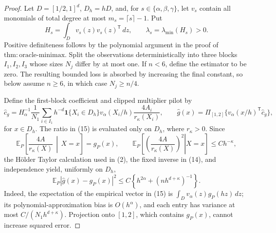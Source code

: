 \documentclass{article}
\begin{document}
\begin{proof}
Let \(D=[1/2,1]^d\), \(D_h=hD\), and, for \(s\in\{\alpha,\beta,\gamma\}\), let \(v_s\) contain all monomials of total degree at most \(m_s=\lceil s\rceil-1\).  Put
\[
 H_s=\int_Dv_s(z)v_s(z)^{\mathsf T}\,dz,
 \qquad \lambda_s=\lambda_{\min}(H_s)>0. \tag{14}
\]
Positive definiteness follows by the polynomial argument in the proof of \(\mathrm{thm:oracle\mbox{-}minimax}\).  Split the observations deterministically into three blocks \(I_1,I_2,I_3\) whose sizes \(N_j\) differ by at most one.  If \(n<6\), define the estimator to be zero.  The resulting bounded loss is absorbed by increasing the final constant, so below assume \(n\ge6\), in which case \(N_j\ge n/4\).

Define the first-block coefficient and clipped multiplier pilot by
\[
 \widehat c_g
 =H_\alpha^{-1}\frac1{N_1}\sum_{i\in I_1}h^{-d}\mathbf1\{X_i\in D_h\}v_\alpha(X_i/h)
 \frac{4A_i}{r_\kappa(X_i)},
 \qquad
 \widehat g(x)=\Pi_{[1,2]}\{v_\alpha(x/h)^{\mathsf T}\widehat c_g\}, \tag{15}
\]
for \(x\in D_h\).  The ratio in (15) is evaluated only on \(D_h\), where \(r_\kappa>0\).  Since
\[
 \mathbb E_P\left[\frac{4A}{r_\kappa(X)}\,\middle|\,X=x\right]=g_P(x),
 \qquad
 \mathbb E_P\left[\left.\left(\frac{4A}{r_\kappa(X)}\right)^2\right|X=x\right]
 \le C h^{-\kappa}, \tag{16}
\]
the H\"older Taylor calculation used in (2), the fixed inverse in (14), and independence yield, uniformly on \(D_h\),
\[
 \mathbb E_P|\widehat g(x)-g_P(x)|^2
 \le C\left\{h^{2\alpha}+(nh^{d+\kappa})^{-1}\right\}. \tag{17}
\]
Indeed, the expectation of the empirical vector in (15) is \(\int_Dv_\alpha(z)g_P(hz)\,dz\); its polynomial-approximation bias is \(O(h^\alpha)\), and each entry has variance at most \(C/(N_1h^{d+\kappa})\).  Projection onto \([1,2]\), which contains \(g_P(x)\), cannot increase squared error.


\end{proof}
\end{document}
